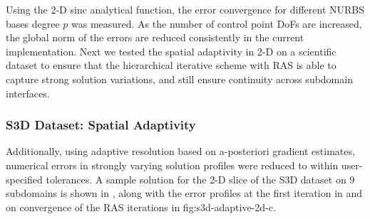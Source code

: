 Using the 2-D sinc analytical function, the error convergence for different NURBS bases degree $p$ was measured. As the number of control point DoFs are increased, the global norm of the errors are reduced consistently in the current implementation. Next we tested the spatial adaptivity in 2-D on a scientific dataset to ensure that the hierarchical iterative scheme with RAS is able to capture strong solution variations, and still ensure continuity across subdomain interfaces. 

\subsubsection{S3D Dataset: Spatial Adaptivity}

Additionally, using adaptive resolution based on a-posteriori gradient estimates, numerical errors in strongly varying solution profiles were reduced to within user-specified tolerances. A sample solution for the 2-D slice of the S3D dataset on 9 subdomains is shown in , along with the error profiles at the first iteration in  and on convergence of the RAS iterations in {fig:s3d-adaptive-2d-c}.

